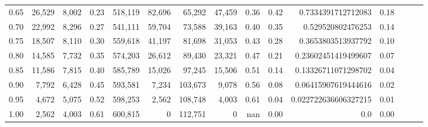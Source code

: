 \begin{tabular}{rrrrrrrrrrrrrrr}
0.65 &  26,529 &  8,002 &  0.23 &  518,119 &   82,696 &   65,292 &   47,459 &  0.36 &  0.42 &    0.7334391712712083 &      0.18 \\
0.70 &  22,992 &  8,296 &  0.27 &  541,111 &   59,704 &   73,588 &   39,163 &  0.40 &  0.35 &     0.529520802476253 &      0.14 \\
0.75 &  18,507 &  8,110 &  0.30 &  559,618 &   41,197 &   81,698 &   31,053 &  0.43 &  0.28 &    0.3653803513937792 &      0.10 \\
0.80 &  14,585 &  7,732 &  0.35 &  574,203 &   26,612 &   89,430 &   23,321 &  0.47 &  0.21 &   0.23602451419499607 &      0.07 \\
0.85 &  11,586 &  7,815 &  0.40 &  585,789 &   15,026 &   97,245 &   15,506 &  0.51 &  0.14 &   0.13326711071298702 &      0.04 \\
0.90 &   7,792 &  6,428 &  0.45 &  593,581 &    7,234 &  103,673 &    9,078 &  0.56 &  0.08 &   0.06415907619444616 &      0.02 \\
0.95 &   4,672 &  5,075 &  0.52 &  598,253 &    2,562 &  108,748 &    4,003 &  0.61 &  0.04 &  0.022722636606327215 &      0.01 \\
1.00 &   2,562 &  4,003 &  0.61 &  600,815 &        0 &  112,751 &        0 &   nan &  0.00 &                   0.0 &      0.00 \\
\bottomrule
\end{tabular}
